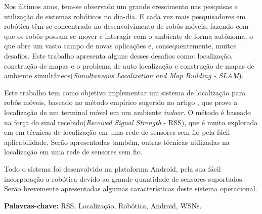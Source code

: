 	Nos últimos anos, tem-se observado um grande crescimento nas pesquisas e utilização de sistemas robóticos no dia-dia.
	E cada vez mais pesquisadores em robótica têm se concentrado no desenvolvimento de robôs móveis, fazendo com que os
	 robôs possam se mover e interagir com o ambiente de forma autônoma, 
	o que abre um vasto campo de novas aplicações e, consequentemente, muitos desafios. Este trabalho 
	apresenta alguns desses desafios como:  localização, construção de mapas e o problema
	de auto localização e construção 
  de mapas de ambiente simultâneos(\textit{Simultaneous Localization and Map Building - SLAM}). 
		
  Este trabalho tem como objetivo implementar um sistema de localização para robôs móveis, 
  baseado no método empírico sugerido no artigo \cite{wifiRadar},
  que prove a localização de um terminal móvel em um ambiente \textit{indoor}. 
  O método é baseado na força do 
  sinal recebido(\textit{Received Signal Strength} - RSS), que é muito explorada em
  em técnicas de localização em uma rede de sensores sem fio pela fácil aplicabilidade. Serão apresentadas também, outras 
  técnicas utilizadas na localização em uma rede de sensores sem fio.
  
	Todo o sistema foi desenvolvido na plataforma Android, pela sua fácil incorporação a robótica devido ao 
	grande quantidade de sensores suportados. Serão brevemente apresentadas
	algumas características deste sistema operacional.
   
\textbf{Palavras-chave:} RSS, Localização, Robótica, Android, WSNs.